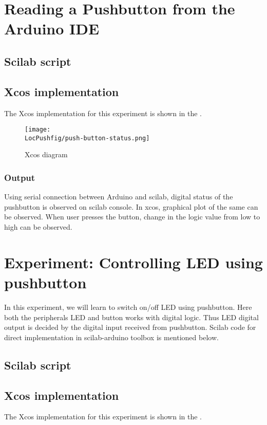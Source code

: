 \section{Reading a Pushbutton from the Arduino IDE}
\subsection{Scilab script}



\subsection{Xcos implementation}
The Xcos implementation for this experiment is shown in the .

\begin{figure}
\centering
\texttt{[image: \\LocPushfig/push-button-status.png]}
\caption{Xcos diagram}
\label{fig:pushbuttonstat}
\end{figure}

\subsubsection{Output}
Using serial connection between Arduino and scilab,  digital status of the pushbutton is observed on scilab console. In xcos, graphical plot of the same can be observed. When user presses the button, change in the logic value from low to high can be observed. 


\section{Experiment: Controlling LED using pushbutton}
In this experiment, we will learn to switch on/off LED using pushbutton. Here both the peripherals LED and button works with digital logic. Thus LED digital output is decided by the digital input received from pushbutton. Scilab code for direct implementation in scilab-arduino toolbox is mentioned below.

\subsection{Scilab script}



\subsection{Xcos implementation}
The Xcos implementation for this experiment is shown in the .

